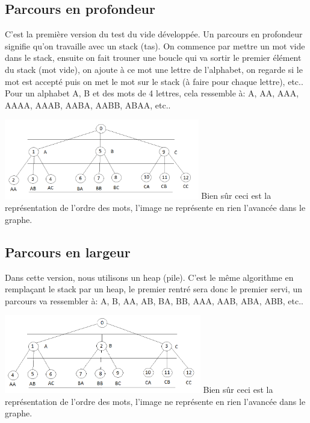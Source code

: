 \subsection{Parcours en profondeur}
C'est la première version du test du vide développée. Un parcours en profondeur signifie qu'on travaille avec un stack (tas). On commence par mettre un mot vide dans le stack, ensuite on fait trouner une boucle qui va sortir le premier élément du stack (mot vide), on ajoute à ce mot une lettre de l'alphabet, on regarde si le mot est accepté puis on met le mot sur le stack (à faire pour chaque lettre), etc.. Pour un alphabet {A, B} et des mots de 4 lettres, cela ressemble à: A, AA, AAA, AAAA, AAAB, AABA, AABB, ABAA, etc..\par
\includegraphics[height=3.5cm]{a5.png}
Bien sûr ceci est la représentation de l'ordre des mots, l'image ne représente en rien l'avancée dans le graphe.\par

\subsection{Parcours en largeur}
Dans cette version, nous utilisons un heap (pile). C'est le même algorithme en remplaçant le stack par un heap, le premier rentré sera donc le premier servi, un parcours va ressembler à: A, B, AA, AB, BA, BB, AAA, AAB, ABA, ABB, etc..\par
\includegraphics[height=3.4cm]{a4.png}
Bien sûr ceci est la représentation de l'ordre des mots, l'image ne représente en rien l'avancée dans le graphe.\par

